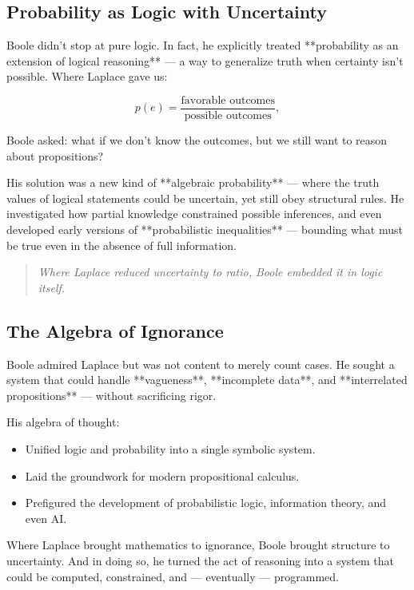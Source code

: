 \subsection{Probability as Logic with Uncertainty}

Boole didn’t stop at pure logic. In fact, he explicitly treated **probability as an extension of logical reasoning** — a way to generalize truth when certainty isn’t possible. Where Laplace gave us:

\[
p(e) = \frac{\text{favorable outcomes}}{\text{possible outcomes}},
\]

Boole asked: what if we don’t know the outcomes, but we still want to reason about propositions?

His solution was a new kind of **algebraic probability** — where the truth values of logical statements could be uncertain, yet still obey structural rules. He investigated how partial knowledge constrained possible inferences, and even developed early versions of **probabilistic inequalities** — bounding what must be true even in the absence of full information.

\begin{quote}
\textit{Where Laplace reduced uncertainty to ratio, Boole embedded it in logic itself.}
\end{quote}

\subsection{The Algebra of Ignorance}

Boole admired Laplace but was not content to merely count cases. He sought a system that could handle **vagueness**, **incomplete data**, and **interrelated propositions** — without sacrificing rigor.

His algebra of thought:
\begin{itemize}
    \item Unified logic and probability into a single symbolic system.
    \item Laid the groundwork for modern propositional calculus.
    \item Prefigured the development of probabilistic logic, information theory, and even AI.
\end{itemize}

Where Laplace brought mathematics to ignorance, Boole brought structure to uncertainty. And in doing so, he turned the act of reasoning into a system that could be computed, constrained, and — eventually — programmed.

